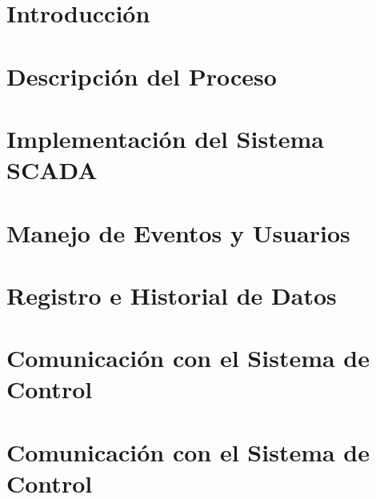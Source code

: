 \documentclass[
	spanish, %
	letterpaper, oneside
]{book}
\begin{document}
\templatePortrait

\templatePagecfg




\templateIndex

\templateFinalcfg






\chapter*{Introducción}
\chapter{Descripción del Proceso}
\chapter{Implementación del Sistema SCADA}
\chapter{Manejo de Eventos y Usuarios}
\chapter{Registro e Historial de Datos}
\chapter{Comunicación con el Sistema de Control}
\chapter{Comunicación con el Sistema de Control}




\end{document}
